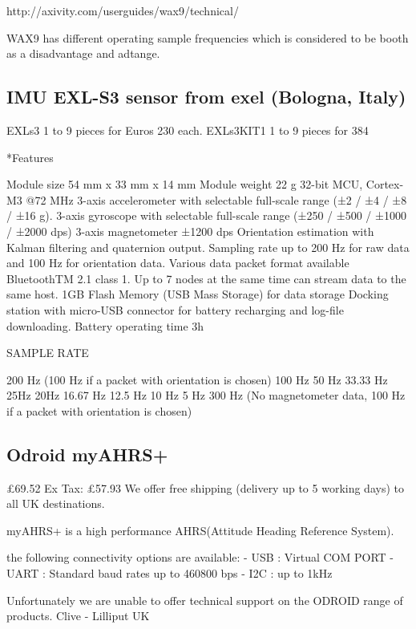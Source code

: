  http://axivity.com/userguides/wax9/technical/

 WAX9 has different operating sample frequencies which is considered
 to be booth as a disadvantage and adtange.




 \subsection*{IMU EXL-S3 sensor from exel (Bologna, Italy)}

 EXLs3 1 to 9 pieces for Euros 230 each.
 EXLs3KIT1 1 to 9 pieces for 384

 *Features

 Module size 54 mm x 33 mm x 14 mm
 Module weight 22 g
 32-bit MCU, Cortex-M3 @72 MHz
 3-axis accelerometer with selectable full-scale range (±2 / ±4 / ±8 / ±16 g).
 3-axis gyroscope with selectable full-scale range (±250 / ±500 / ±1000 / ±2000 dps)
 3-axis magnetometer ±1200 dps
 Orientation estimation with Kalman filtering and quaternion output.
 Sampling rate up to 200 Hz for raw data and 100 Hz for orientation data.
 Various data packet format available
 BluetoothTM 2.1 class 1.
 Up to 7 nodes at the same time can stream data to the same host.
 1GB Flash Memory (USB Mass Storage) for data storage
 Docking station with micro-USB connector for battery recharging and log-file downloading.
 Battery operating time 3h

 SAMPLE RATE

 200 Hz (100 Hz if a packet with orientation is chosen)
 100 Hz
 50 Hz
 33.33 Hz
 25Hz
 20Hz
 16.67 Hz
 12.5 Hz
 10 Hz
  5 Hz
 300 Hz (No magnetometer data, 100 Hz if a packet with orientation
 is chosen)



 \subsection*{Odroid myAHRS+}

 £69.52
 Ex Tax: £57.93
  We offer free shipping (delivery up to 5 working days) to all UK destinations.

 myAHRS+ is a high performance AHRS(Attitude Heading Reference System).

 the following connectivity options are available:
    - USB : Virtual COM PORT
    - UART : Standard baud rates up to 460800 bps
    - I2C : up to 1kHz

  Unfortunately we are unable to offer technical support on the ODROID range of products.
 Clive - Lilliput UK

